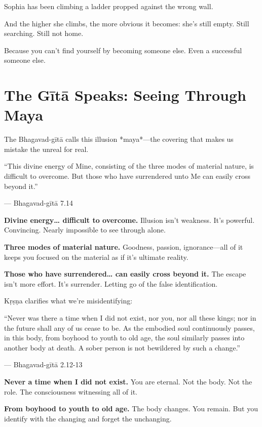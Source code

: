 \documentclass[11pt,twoside]{book}
\begin{document}
Sophia has been climbing a ladder propped against the wrong wall.

And the higher she climbs, the more obvious it becomes: she's still empty. Still searching. Still not home.

Because you can't find yourself by becoming someone else. Even a successful someone else.

\section*{The Gītā Speaks: Seeing Through Maya}

The Bhagavad-gītā calls this illusion *maya*—the covering that makes us mistake the unreal for real.

\begin{pullquote}
``This divine energy of Mine, consisting of the three modes of material nature, is difficult to overcome. But those who have surrendered unto Me can easily cross beyond it.''

--- Bhagavad-gītā 7.14
\end{pullquote}

\textbf{\textbf{Divine energy\ldots{} difficult to overcome.}} Illusion isn't weakness. It's powerful. Convincing. Nearly impossible to see through alone.

\textbf{\textbf{Three modes of material nature.}} Goodness, passion, ignorance—all of it keeps you focused on the material as if it's ultimate reality.

\textbf{\textbf{Those who have surrendered\ldots{} can easily cross beyond it.}} The escape isn't more effort. It's surrender. Letting go of the false identification.

Kṛṣṇa clarifies what we're misidentifying:

\begin{pullquote}
``Never was there a time when I did not exist, nor you, nor all these kings; nor in the future shall any of us cease to be. As the embodied soul continuously passes, in this body, from boyhood to youth to old age, the soul similarly passes into another body at death. A sober person is not bewildered by such a change.''

--- Bhagavad-gītā 2.12-13
\end{pullquote}

\textbf{\textbf{Never a time when I did not exist.}} You are eternal. Not the body. Not the role. The consciousness witnessing all of it.

\textbf{\textbf{From boyhood to youth to old age.}} The body changes. You remain. But you identify with the changing and forget the unchanging.
\end{document}
